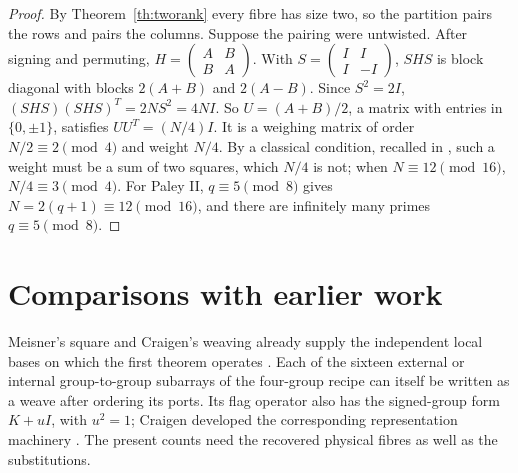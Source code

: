 \documentclass[11pt,reqno]{amsart}
\theoremstyle{remark}\newtheorem{remark}[theorem]{Remark}
\begin{document}
\begin{proof}
By Theorem~\ref{th:tworank} every fibre has size two, so the partition pairs the rows and pairs the columns. Suppose the pairing were untwisted. After signing and permuting, \(H=\left(\begin{smallmatrix}A&B\\B&A\end{smallmatrix}\right)\). With \(S=\left(\begin{smallmatrix}I&I\\I&-I\end{smallmatrix}\right)\), \(SHS\) is block diagonal with blocks \(2(A+B)\) and \(2(A-B)\). Since \(S^2=2I\), \((SHS)(SHS)^T=2N S^2=4NI\). So \(U=(A+B)/2\), a matrix with entries in \(\{0,\pm1\}\), satisfies \(UU^T=(N/4)I\). It is a weighing matrix of order \(N/2\equiv2\pmod 4\) and weight \(N/4\). By a classical condition, recalled in \cite[p.~2]{christian}, such a weight must be a sum of two squares, which \(N/4\) is not; when \(N\equiv12\pmod{16}\), \(N/4\equiv3\pmod 4\). For Paley II, \(q\equiv5\pmod 8\) gives \(N=2(q+1)\equiv12\pmod{16}\), and there are infinitely many primes \(q\equiv5\pmod 8\).
\end{proof}

\section{Comparisons with earlier work}
Meisner's square and Craigen's weaving already supply the independent local bases on which the first theorem operates \cite{meisner,craigen}. Each of the sixteen external or internal group-to-group subarrays of the four-group recipe can itself be written as a weave after ordering its ports. Its flag operator also has the signed-group form \(K+uI\), with \(u^2=1\); Craigen developed the corresponding representation machinery \cite{signed}. The present counts need the recovered physical fibres as well as the substitutions.
\end{document}
